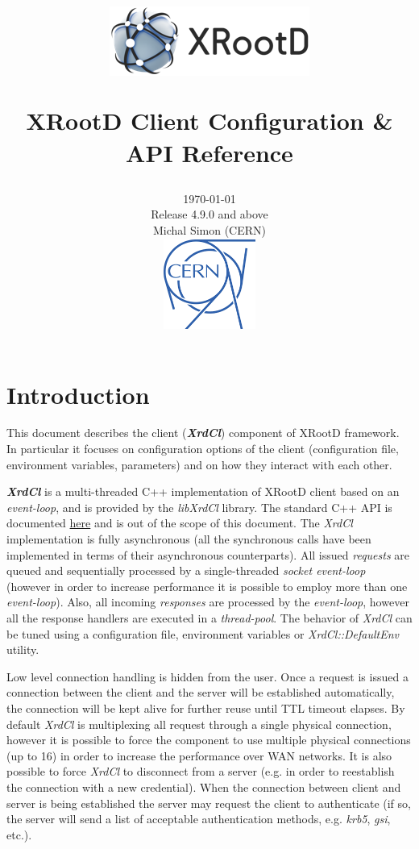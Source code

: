 \documentclass{article}
\title{\includegraphics{xrootd-logo.png} \\ \rule[75pt]{0pt}{0pt} \huge \textbf{XRootD Client Configuration \& API Reference}}
\author{\rule[75pt]{0pt}{0pt} \small \today \\ \small Release 4.9.0 and above \\ \small Michal Simon (CERN) \\ \includegraphics[width=3cm, height=3cm]{cern-logo.png}}
\date{}
\begin{document}
\maketitle

\newpage

\tableofcontents

\newpage

\section{Introduction}
    
    This document describes the client (\textit{\textbf{XrdCl}}) component of XRootD framework. In particular it focuses
    on configuration options of the client (configuration file, environment variables, parameters) and on how they
    interact with each other.
    
    \textit{\textbf{XrdCl}} is a multi-threaded C++ implementation of XRootD client based on an \textit{event-loop}, and is provided 
    by the \textit{libXrdCl} library. The standard C++ API is documented \href{http://xrootd.org/doc/doxygen/current/html/annotated.html}
	{here} and is out of the scope of this document. The \textit{XrdCl} implementation is fully asynchronous (all the synchronous 
	calls have been implemented in terms of their asynchronous counterparts). All issued \textit{requests} are queued and sequentially 
	processed by a single-threaded \textit{socket event-loop} (however in order to increase performance it is possible to employ more 
	than one \textit{event-loop}). Also, all incoming \textit{responses} are processed by the \textit{event-loop}, however all the 
	response handlers are executed in a \textit{thread-pool}. The behavior of \textit{XrdCl} can be tuned using a configuration file,
	environment variables or \textit{XrdCl::DefaultEnv} utility. 
	
	Low level connection handling is hidden from the user. Once a request is issued a connection between the client and the server will 
	be established automatically, the connection will be kept alive for further reuse until TTL timeout elapses. By default \textit{XrdCl} 
	is multiplexing all request through a single physical connection, however it is possible to force the component to use multiple physical 
	connections (up to 16) in order to increase the performance over WAN networks. It is also possible to force \textit{XrdCl} to disconnect
	from a server (e.g. in order to reestablish the connection with a new credential). When the connection between client and server is 
	being established the server may request the client to authenticate (if so, the server will send a list of acceptable authentication 
	methods, e.g. \textit{krb5}, \textit{gsi}, etc.).
\end{document}
